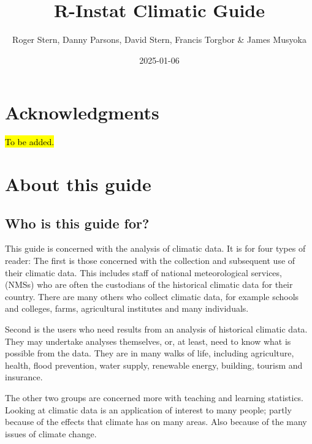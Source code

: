 \documentclass[
  letterpaper,
  DIV=11,
  numbers=noendperiod]{scrreprt}
\title{R-Instat Climatic Guide}
\author{Roger Stern, Danny Parsons, David Stern, Francis Torgbor \&
James Musyoka}
\date{2025-01-06}
\renewcommand*\contentsname{Table of contents}
\newcommand\contentsname{Table of contents}
\begin{document}
\maketitle

\renewcommand*\contentsname{Table of contents}
{
\hypersetup{linkcolor=}
\setcounter{tocdepth}{2}
\tableofcontents
}

\chapter*{Acknowledgments}\label{acknowledgments}


\hl{To be added.}


\chapter{About this guide}\label{about-this-guide}

\section{Who is this guide for?}\label{who-is-this-guide-for}

This guide is concerned with the analysis of climatic data. It is for
four types of reader: The first is those concerned with the collection
and subsequent use of their climatic data. This includes staff of
national meteorological services, (NMSs) who are often the custodians of
the historical climatic data for their country. There are many others
who collect climatic data, for example schools and colleges, farms,
agricultural institutes and many individuals.

Second is the users who need results from an analysis of historical
climatic data. They may undertake analyses themselves, or, at least,
need to know what is possible from the data. They are in many walks of
life, including agriculture, health, flood prevention, water supply,
renewable energy, building, tourism and insurance.

The other two groups are concerned more with teaching and learning
statistics. Looking at climatic data is an application of interest to
many people; partly because of the effects that climate has on many
areas. Also because of the many issues of climate change.
\end{document}
